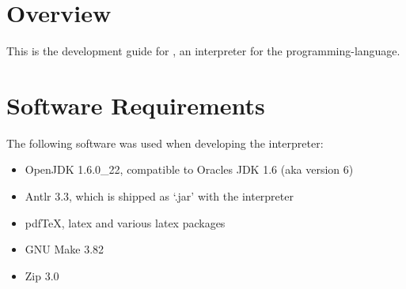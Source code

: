 \def\myDocumentTypeArticle{-}


\globalDate{\today}






\begin{titlepage}
\maketitle
\vfill
\tableofcontents
\end{titlepage}

\section{Overview}

This is the development guide for \setlX, an interpreter for the \SetlX{} programming-language.

\section{Software Requirements}

The following software was used when developing the \setlX{} interpreter:

\begin{itemize}
	\item OpenJDK 1.6.0\_22, compatible to Oracles JDK 1.6 (aka version 6)
	\item Antlr 3.3, which is shipped as `.jar' with the interpreter
	\item pdfTeX, latex and various latex packages
	\item GNU Make 3.82
	\item Zip 3.0
\end{itemize}

